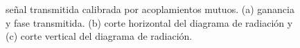 \begin{figure}[H]
	\centering

	\caption{señal transmitida calibrada por acoplamientos mutuos. (a) ganancia y fase transmitida. (b) corte horizontal del 
	diagrama de radiación y (c) corte vertical del diagrama de radiación.}
	\label{fig:compErrMutual10degCol}
\end{figure}

